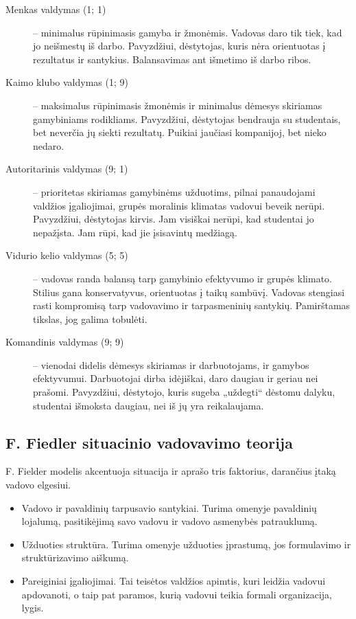 \begin{description}
  \item[Menkas valdymas (1; 1)] – minimalus rūpinimasis gamyba ir žmonėmis.
    Vadovas daro tik tiek, kad jo neišmestų iš darbo. Pavyzdžiui,
    dėstytojas, kuris nėra orientuotas į rezultatus ir santykius.
    Balansavimas ant išmetimo iš darbo ribos.
  \item[Kaimo klubo valdymas (1; 9)] – maksimalus rūpinimasis žmonėmis
    ir minimalus dėmesys skiriamas gamybiniams rodikliams. Pavyzdžiui,
    dėstytojas bendrauja su studentais, bet neverčia jų siekti
    rezultatų. Puikiai jaučiasi kompanijoj, bet nieko nedaro.
  \item[Autoritarinis valdymas (9; 1)] – prioritetas skiriamas gamybinėms
    užduotims, pilnai panaudojami valdžios įgaliojimai, grupės moralinis
    klimatas vadovui beveik nerūpi. Pavyzdžiui, dėstytojas kirvis.
    Jam visiškai nerūpi, kad studentai jo nepažįsta. Jam rūpi, kad jie
    įsisavintų medžiagą.
  \item[Vidurio kelio valdymas (5; 5)] – vadovas randa balansą tarp
    gamybinio efektyvumo ir grupės klimato. Stilius gana konservatyvus,
    orientuotas į taikų sambūvį. Vadovas stengiasi rasti kompromisą
    tarp vadovavimo ir tarpasmeninių santykių. Pamirštamas tikslas,
    jog galima tobulėti.
  \item[Komandinis valdymas (9; 9)] – vienodai didelis dėmesys skiriamas
    ir darbuotojams, ir gamybos efektyvumui. Darbuotojai dirba idėjiškai,
    daro daugiau ir geriau nei prašomi. Pavyzdžiui, dėstytojo, kuris
    sugeba „uždegti“ dėstomu dalyku, studentai išmoksta daugiau, nei
    iš jų yra reikalaujama.
\end{description}

\subsection{F. Fiedler situacinio vadovavimo teorija}

F. Fielder modelis akcentuoja situacija ir aprašo tris faktorius,
darančius įtaką vadovo elgesiui.
\begin{itemize}
  \item Vadovo ir pavaldinių tarpusavio santykiai. Turima omenyje
    pavaldinių lojalumą, pasitikėjimą savo vadovu ir vadovo
    asmenybės patrauklumą.
  \item Užduoties struktūra. Turima omenyje užduoties įprastumą,
    jos formulavimo ir struktūrizavimo aiškumą.
  \item Pareiginiai įgaliojimai. Tai teisėtos valdžios apimtis, kuri
    leidžia vadovui apdovanoti, o taip pat paramos, kurią vadovui
    teikia formali organizacija, lygis.
\end{itemize}

